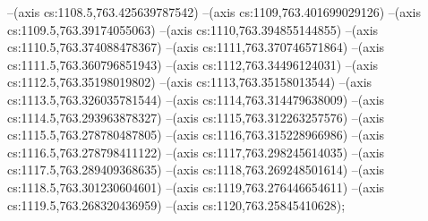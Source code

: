 --(axis cs:1108.5,763.425639787542)
--(axis cs:1109,763.401699029126)
--(axis cs:1109.5,763.39174055063)
--(axis cs:1110,763.394855144855)
--(axis cs:1110.5,763.374088478367)
--(axis cs:1111,763.370746571864)
--(axis cs:1111.5,763.360796851943)
--(axis cs:1112,763.34496124031)
--(axis cs:1112.5,763.35198019802)
--(axis cs:1113,763.35158013544)
--(axis cs:1113.5,763.326035781544)
--(axis cs:1114,763.314479638009)
--(axis cs:1114.5,763.293963878327)
--(axis cs:1115,763.312263257576)
--(axis cs:1115.5,763.278780487805)
--(axis cs:1116,763.315228966986)
--(axis cs:1116.5,763.278798411122)
--(axis cs:1117,763.298245614035)
--(axis cs:1117.5,763.289409368635)
--(axis cs:1118,763.269248501614)
--(axis cs:1118.5,763.301230604601)
--(axis cs:1119,763.276446654611)
--(axis cs:1119.5,763.268320436959)
--(axis cs:1120,763.25845410628);

